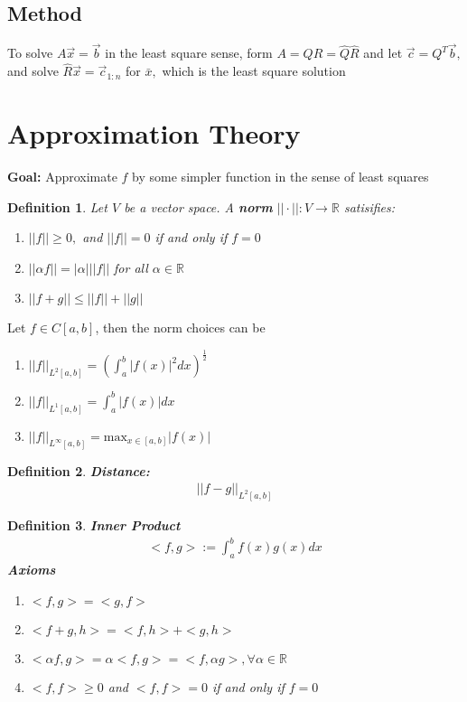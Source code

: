 \documentclass[11pt,oneside]{book}
\theoremstyle{break}
\theoremstyle{break}
\newtheorem{defn}{Definition}[corL]
\newcommand{\R}{\mathbb{R}}
\begin{document}
 \subsection[Method]{Method}
 To solve $A\vec{x}=\vec{b}$ in the least square sense, form $A=QR=\hat{Q}\hat{R}$ and let $\vec{c}=Q^T\vec{b},$ and solve $\hat{R}\vec{x}=\vec{c}_{1:n}$ for $\bar{x},$ which is the least square solution
 \section[Approximation Theory]{Approximation Theory}
 \textbf{Goal:} Approximate $f$ by some simpler function in the sense of least squares
 \begin{defn}
 Let $V$ be a vector space. A \textbf{norm} $||\cdot||:V\to \R$ satisifies:\begin{enumerate}
 \item $||f||\geq 0,$ and $||f||=0$ if and only if $f=0$
 \item $||\alpha f||=|\alpha|||f||$ for all $\alpha \in \R$
 \item $||f+g||\leq ||f||+||g||$
 \end{enumerate}
 \end{defn}
 Let $f\in C[a,b]$, then the norm choices can be \begin{enumerate}
 \item $||f||_{L^2[a,b]}=\left(\int_{a}^b|f(x)|^2dx \right)^{\frac{1}{2}}$
 \item  $||f||_{L^1[a,b]}=\int_{a}^{b}|f(x)|dx$
 \item $||f||_{L^{\infty}[a,b]}=\text{max}_{x\in [a,b]}|f(x)|$
 \end{enumerate}
 \begin{defn}
 \textbf{Distance:} \begin{align*}
 ||f-g||_{L^2[a,b]} 
 \end{align*}
 \end{defn}
 \begin{defn}
 \textbf{Inner Product}\begin{align*}
 <f,g>:=\int_{a}^b f(x)g(x)dx
 \end{align*}
 \textbf{Axioms}\begin{enumerate}
 \item $<f,g>=<g,f>$
 \item $<f+g,h>=<f,h>+<g,h>$
 \item $<\alpha f,g>=\alpha<f,g>=<f,\alpha g>,\forall \alpha \in \R$
 \item $<f,f>\geq 0$ and $<f,f>=0$ if and only if $f=0$
 \end{enumerate}
 \end{defn}
\end{document}
